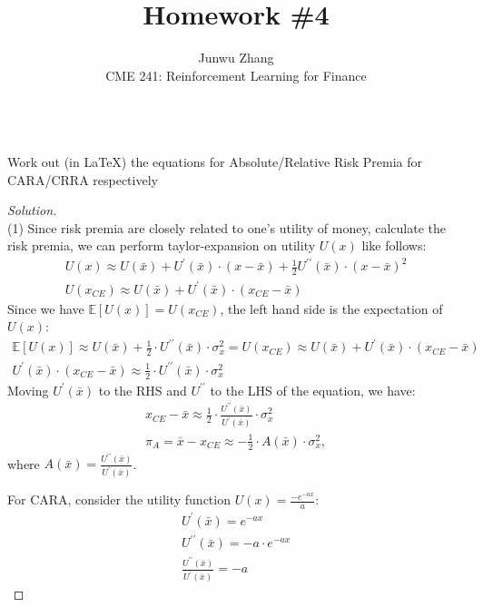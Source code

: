 \documentclass[12pt]{article}
\newenvironment{problem}[2][Problem]{\begin{trivlist}
\item[\hskip \labelsep {\bfseries #1}\hskip \labelsep {\bfseries #2.}]}{\end{trivlist}}
\newenvironment{solution}
  {\renewcommand\qedsymbol{$\blacksquare$}\begin{proof}[Solution]}
  {\end{proof}}
\begin{document}
 
\title{Homework \#4}
\author{Junwu Zhang\\ 
CME 241: Reinforcement Learning for Finance}
 
\maketitle

\begin{problem}{1}
\text{ }\\
Work out (in \LaTeX) the equations for Absolute/Relative Risk Premia for CARA/CRRA respectively
\end{problem}
\begin{solution}
\text{ }\\
(1) Since risk premia are closely related to one's utility of money, calculate the risk premia, we can perform taylor-expansion on utility $U(x)$ like follows:
\begin{gather}
	U(x) \approx U(\bar{x}) + U^{\prime}(\bar{x}) \cdot (x-\bar{x}) + \frac{1}{2}U^{\prime\prime}(\bar{x})\cdot (x-\bar{x})^2 \\
	U(x_{CE}) \approx U(\bar{x}) + U^{\prime}(\bar{x}) \cdot (x_{CE} - \bar{x})
\end{gather}
Since we have $\mathbb{E}[U(x)] = U(x_{CE})$, the left hand side is the expectation of $U(x)$:
\begin{gather}
	\mathbb{E}[U(x)] \approx U(\bar{x}) + \frac{1}{2} \cdot U^{\prime\prime}(\bar{x})\cdot \sigma_x^2 = U(x_{CE}) \approx U(\bar{x}) + U^{\prime}(\bar{x}) \cdot (x_{CE} - \bar{x}) \\
	U^{\prime}(\bar{x}) \cdot (x_{CE} - \bar{x}) \approx \frac{1}{2} \cdot U^{\prime\prime}(\bar{x})\cdot \sigma_x^2
\end{gather}
Moving $U^{\prime}(\bar{x})$ to the \gls*{RHS} and $U^{\prime\prime}$ to the \gls*{LHS} of the equation, we have:
\begin{gather}
x_{CE} - \bar{x} \approx \frac{1}{2} \cdot \frac{U^{\prime\prime}(\bar{x})}{U^{\prime}(\bar{x})}\cdot \sigma_x^2 \\
\pi_A = \bar{x} - x_{CE} \approx -\frac{1}{2} \cdot A(\bar{x}) \cdot \sigma_x^2,
\end{gather}
where $A(\bar{x}) = \frac{U^{\prime\prime}(\bar{x})}{U^{\prime}(\bar{x})}$.

For \gls{CARA}, consider the utility function $U(x) = \frac{-e^{-ax}}{a}$:
\begin{gather}
	U^{\prime}(\bar{x}) = e^{-ax} \\
	U^{\prime\prime}(\bar{x}) = -a\cdot e^{-ax} \\
	\frac{U^{\prime\prime}(\bar{x})}{U^{\prime}(\bar{x})} = -a
\end{gather}


\end{solution}
\end{document}
